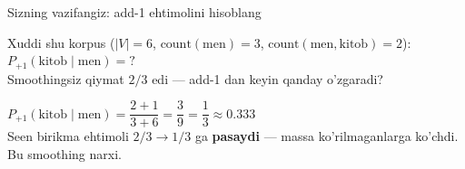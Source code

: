 \documentclass[aspectratio=169,11pt]{beamer}
\begin{document}
\begin{frame}{Sizning vazifangiz: add-1 ehtimolini hisoblang}
  \begin{tcolorbox}[warnbox,title=Savol --- 90 soniya]
    \small
    Xuddi shu korpus ($|V|=6$, $\text{count}(\text{men})=3$,
    $\text{count}(\text{men},\text{kitob})=2$):\\[4pt]
    \textbf{\large $P_{+1}(\text{kitob}\mid\text{men}) = ?$}\\[3pt]
    \footnotesize Smoothingsiz qiymat $2/3$ edi --- add-1 dan keyin qanday o'zgaradi?
  \end{tcolorbox}
  \pause
  \begin{tcolorbox}[okbox,title=Javob]
    \small
    $P_{+1}(\text{kitob}\mid\text{men}) = \dfrac{2+1}{3+6} = \dfrac{3}{9}
       = \dfrac{1}{3} \approx \mathbf{0.333}$\\[3pt]
    \footnotesize Seen birikma ehtimoli $2/3 \to 1/3$ ga \textbf{pasaydi} ---
    massa ko'rilmaganlarga ko'chdi. Bu smoothing narxi.
  \end{tcolorbox}
\end{frame}
\end{document}
